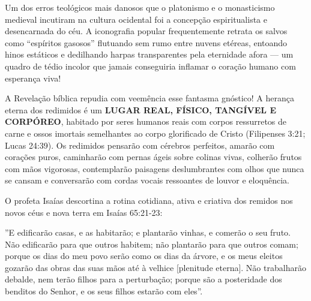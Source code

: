 Um dos erros teológicos mais danosos que o platonismo e o monasticismo medieval incutiram na cultura ocidental foi a concepção espiritualista e desencarnada do céu. A iconografia popular frequentemente retrata os salvos como ``espíritos gasosos'' flutuando sem rumo entre nuvens etéreas, entoando hinos estáticos e dedilhando harpas transparentes pela eternidade afora — um quadro de tédio incolor que jamais conseguiria inflamar o coração humano com esperança viva!

A Revelação bíblica repudia com veemência esse fantasma gnóstico!
A herança eterna dos redimidos é um \textbf{LUGAR REAL, FÍSICO, TANGÍVEL E CORPÓREO}, habitado por seres humanos reais com corpos ressurretos de carne e ossos imortais semelhantes ao corpo glorificado de Cristo (Filipenses 3:21; Lucas 24:39).
Os redimidos pensarão com cérebros perfeitos, amarão com corações puros, caminharão com pernas ágeis sobre colinas vivas, colherão frutos com mãos vigorosas, contemplarão paisagens deslumbrantes com olhos que nunca se cansam e conversarão com cordas vocais ressoantes de louvor e eloquência.

O profeta Isaías descortina a rotina cotidiana, ativa e criativa dos remidos nos novos céus e nova terra em Isaías 65:21-23:

''E edificarão casas, e as habitarão; e plantarão vinhas, e comerão o seu fruto.
Não edificarão para que outros habitem; não plantarão para que outros comam; porque os dias do meu povo serão como os dias da árvore, e os meus eleitos gozarão das obras das suas mãos até à velhice [plenitude eterna].
Não trabalharão debalde, nem terão filhos para a perturbação; porque são a posteridade dos benditos do Senhor, e os seus filhos estarão com eles''.

